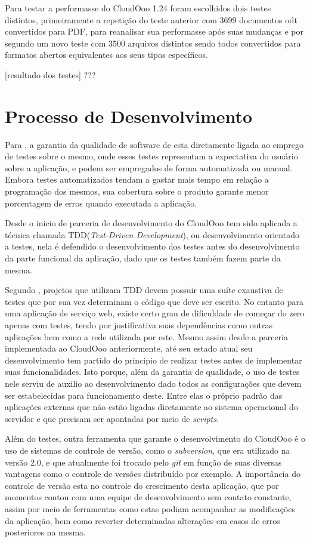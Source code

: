 Para testar a performasse do CloudOoo 1.24 foram escolhidos dois testes distintos, primeiramente a repetição do teste anterior com 3699 documentos odt convertidos para PDF, para reanalisar sua performasse após suas mudanças e por segundo um novo teste com 3500 arquivos distintos sendo todos convertidos para formatos abertos equivalentes aos seus tipos específicos.

[resultado dos testes] ???

\section{Processo de Desenvolvimento}

Para \cite{PRESSMAN}, a garantia da qualidade de software de esta diretamente ligada ao emprego de testes sobre o mesmo, onde esses testes representam a expectativa do usuário sobre a aplicação, e podem ser empregados de forma automatizada ou manual. Embora testes automatizados tendam a gastar mais tempo em relação a programação dos mesmos, sua cobertura sobre o produto garante menor porcentagem de erros quando executada a aplicação.

Desde o inicio de parceria de desenvolvimento do CloudOoo tem sido aplicada a técnica chamada TDD(\textit{Test-Driven Development}), ou desenvolvimento orientado a testes, nela é defendido o desenvolvimento dos testes antes do desenvolvimento da parte funcional da aplicação, dado que os testes também fazem parte da mesma.

Segundo \cite{ASTELS}, projetos que utilizam TDD devem possuir uma suíte exaustiva de testes que por sua vez determinam o código que deve ser escrito. No entanto para uma aplicação de serviço web, existe certo grau de dificuldade de começar do zero apenas com testes, tendo por justificativa suas dependências como outras aplicações bem como a rede utilizada por este. Mesmo assim desde a parceria implementada ao CloudOoo anteriormente, até seu estado atual seu desenvolvimento tem partido do principio de realizar testes antes de implementar suas funcionalidades. Isto porque, além da garantia de qualidade, o uso de testes nele serviu de auxilio ao desenvolvimento dado todos as configurações que devem ser estabelecidas para funcionamento deste. Entre elas o próprio padrão das aplicações externas que não estão ligadas diretamente ao sistema operacional do servidor e que precisam ser apontadas por meio de \textit{scripts}.

Além do testes, outra ferramenta que garante o desenvolvimento do CloudOoo é o uso de sistemas de controle de versão, como o \textit{subversion}, que era utilizado na versão 2.0, e que atualmente foi trocado pelo \textit{git} em função de suas diversas vantagens como o controle de versões distribuído por exemplo. A importância do controle de versão esta no controle do crescimento desta aplicação, que por momentos contou com uma equipe de desenvolvimento sem contato constante, assim por meio de ferramentas como estas podiam acompanhar as modificações da aplicação, bem como reverter determinadas alterações em casos de erros posteriores na mesma.

